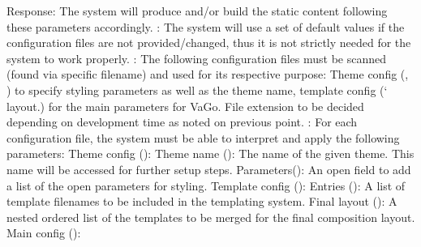 {}Response: The system will produce and/or build the static content following these parameters accordingly.\markdownRendererInterblockSeparator
{}\markdownRendererInterblockSeparator
{}: The system will use a set of default values if the configuration files are not provided/changed, thus it is not strictly needed for the system to work properly.\markdownRendererInterblockSeparator
{}: The following configuration files must be scanned (found via specific filename) and used for its respective purpose: Theme config (, ) to specify styling parameters as well as the theme name, template config (` layout.) for the main parameters for VaGo. File extension to be decided depending on development time as noted on previous point.\markdownRendererInterblockSeparator
{}: For each configuration file, the system must be able to interpret and apply the following parameters:\markdownRendererInterblockSeparator
{}\markdownRendererOlBeginTight
{}Theme config ():\markdownRendererOlItemEnd 
\markdownRendererOlEndTight \markdownRendererInterblockSeparator
{}\markdownRendererUlBeginTight
\markdownRendererUlItem Theme name (): The name of the given theme. This name will be accessed for further setup steps. \markdownRendererUlItemEnd 
\markdownRendererUlItem Parameters(): An open field to add a list of the open parameters for styling.\markdownRendererUlItemEnd 
\markdownRendererUlEndTight \markdownRendererInterblockSeparator
{}\markdownRendererOlBeginTight
{}Template config (): \markdownRendererOlItemEnd 
\markdownRendererOlEndTight \markdownRendererInterblockSeparator
{}\markdownRendererUlBeginTight
\markdownRendererUlItem Entries (): A list of template filenames to be included in the templating system. \markdownRendererUlItemEnd 
\markdownRendererUlItem Final layout (): A nested ordered list of the templates to be merged for the final composition layout. \markdownRendererUlItemEnd 
\markdownRendererUlEndTight \markdownRendererInterblockSeparator
{}\markdownRendererOlBeginTight
{}Main config ():\markdownRendererOlItemEnd 

